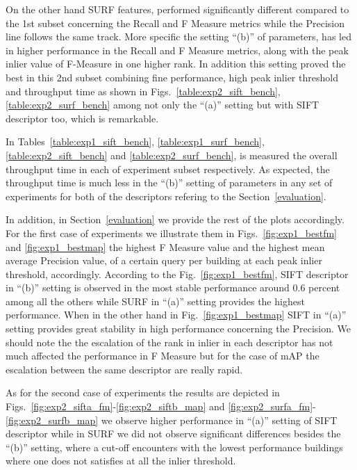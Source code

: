 On the other hand SURF features, performed significantly different compared to the 1st subset concerning the Recall and F Measure metrics while the Precision line follows the same track.
More specific the setting ``(b)'' of parameters, has led in higher performance in the Recall and F Measure metrics, along with the peak inlier value of F-Measure in one higher rank.
In addition this setting proved the best in this 2nd subset combining fine performance, high peak inlier threshold and throughput time as shown in Figs.~\ref{table:exp2_sift_bench},\ref{table:exp2_surf_bench} among not only the ``(a)'' setting but with SIFT descriptor too, which is remarkable.


In Tables~\ref{table:exp1_sift_bench}, \ref{table:exp1_surf_bench}, \ref{table:exp2_sift_bench} and \ref{table:exp2_surf_bench}, is measured the overall throughput time in each of experiment subset respectively.
As expected, the throughput time is much less in the ``(b)'' setting of parameters in any set of experiments for both of the descriptors refering to the Section~\ref{evaluation}.

In addition, in Section~\ref{evaluation} we provide the rest of the plots accordingly.
For the first case of experiments we illustrate them in Figs.~\ref{fig:exp1_bestfm} and \ref{fig:exp1_bestmap} the highest F Measure value and the highest mean average Precision value, of a certain query per building at each peak inlier threshold, accordingly.
According to the Fig.~\ref{fig:exp1_bestfm}, SIFT descriptor in ``(b)'' setting is observed in the most stable performance around 0.6 percent among all the others while SURF in ``(a)'' setting provides the highest performance.
When in the other hand in Fig.~\ref{fig:exp1_bestmap} SIFT  in ``(a)'' setting provides great stability in high performance concerning the Precision.
We should note the the escalation of the rank in inlier in each descriptor has not much affected the performance in F Measure but for the case of mAP the escalation between the same descriptor are really rapid.

As for the second case of experiments the results are depicted in Figs.~\ref{fig:exp2_sifta_fm}-\ref{fig:exp2_siftb_map} and \ref{fig:exp2_surfa_fm}-\ref{fig:exp2_surfb_map} we observe higher performance in ``(a)'' setting of SIFT descriptor while in SURF we did not observe significant differences besides the ``(b)'' setting, where a cut-off encounters with the lowest performance buildings where one does not satisfies at all the inlier threshold.
  
